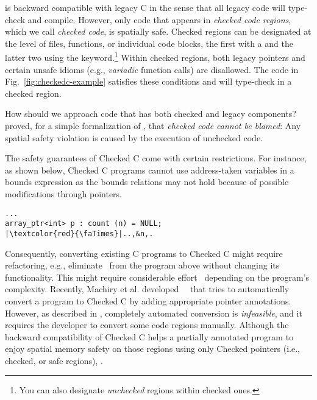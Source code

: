 %
\checkedc is backward compatible with legacy C in the sense that all legacy code
will type-check and compile. However, only code that appears in \emph{checked
  code regions}, which we call \emph{checked code}, is spatially safe. Checked
regions can be designated at the level of files, functions, or individual code
blocks, the first with a  and the latter two using the
 keyword.\footnote{You can also designate \emph{unchecked} regions
  within checked ones.}  Within checked regions, both legacy pointers and
certain unsafe idioms (e.g., \emph{variadic} function calls) are disallowed. The
code in Fig.~\ref{fig:checkedc-example} satisfies these conditions and will
type-check in a checked region.

How should we approach code that has both checked and legacy components?
\citet{li22checkedc} proved, for a simple formalization of \checkedc, that
\emph{checked code cannot be blamed}: Any spatial safety violation is caused by
the execution of unchecked code.
%
% 
% 

%
The safety guarantees of Checked C come with certain restrictions. For instance,
as shown below, Checked C programs cannot use address-taken variables in a
bounds expression as the bounds relations may not hold because of possible
modifications through pointers.
% 
\begin{verbatim}
...
array_ptr<int> p : count (n) = NULL;
|\textcolor{red}{\faTimes}|..,&n,.
\end{verbatim}
% 
Consequently, converting existing C programs to Checked C might require
refactoring, e.g., eliminate~ from the program above without
changing its functionality.
% 
This might require considerable effort~\cite{duanrefactoring} depending on the
program's complexity.
% 
Recently, Machiry et al. developed~\threec~\cite{machiry2022c} that tries to
automatically convert a program to Checked C by adding appropriate pointer
annotations.  However, as described in \threec, completely automated conversion
is \emph{infeasible}, and it requires the developer to convert some code regions
manually.  
% 
Although the backward compatibility of Checked C helps a partially annotated
program to enjoy spatial memory safety on those regions using only Checked
pointers (i.e., checked, or safe regions), .

